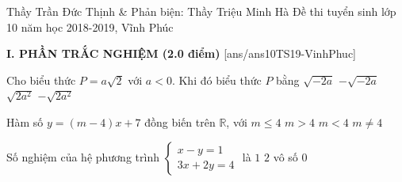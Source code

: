 \begin{name}
{Thầy Trần Đức Thịnh \& Phản biện: Thầy Triệu Minh Hà}
{Đề thi tuyển sinh lớp 10 năm học 2018-2019, Vĩnh Phúc}
\end{name}
\noindent\textbf{I. PHẦN TRẮC NGHIỆM (2.0 điểm)}
\setcounter{ex}{0}
[ans/ans10TS19-VinhPhuc]
\begin{ex}%
Cho biểu thức $P=a\sqrt{2}$ với $a<0$. Khi đó biểu thức $P$ bằng	
\choice
	{$\sqrt{-2a}$}
	{$-\sqrt{-2a}$}
	{$\sqrt{2a^2}$}
	{\True $-\sqrt{2a^2}$}
\end{ex}
\begin{ex}%
Hàm số $y=\left( m-4 \right) x+7$ đồng biến trên $\mathbb{R}$, với	
	\choice
	{$m \leq 4$}
	{\True $m>4$}
	{$m<4$}
	{$m\neq 4$}
\end{ex}
\begin{ex}%
Số nghiệm của hệ phương trình $ \begin{cases} 
x-y=1\\ 
3x+2y=4
\end{cases}$ là
	\choice
	{\True $1$}
	{$2$}
	{vô số}
	{$0$}
\end{ex}
